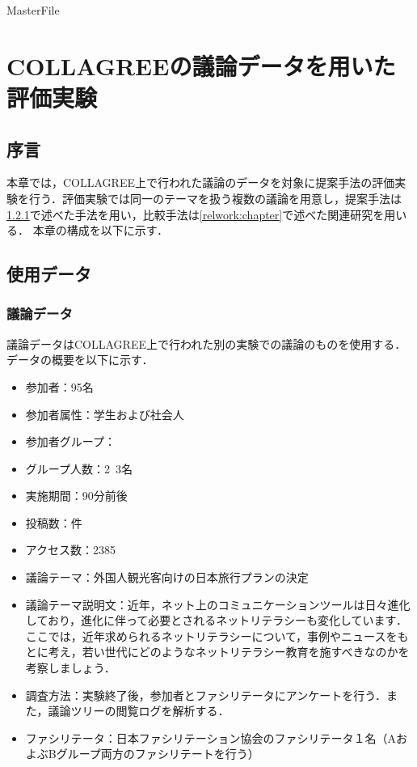 \expandafter\ifx\csname MasterFile\endcsname\relax
\def\SubFile{hoge}


\setcounter{chapter}{4}
\fi
\cleardoublepage
\chapter{COLLAGREEの議論データを用いた評価実験}

\label{exp:chapter}

\section{序言}
\label{exp:introduction}
本章では，COLLAGREE上で行われた議論のデータを対象に提案手法の評価実験を行う．評価実験では同一のテーマを扱う複数の議論を用意し，提案手法は\ref{}で述べた手法を用い，比較手法は\ref{relwork:chapter}で述べた関連研究を用いる．
本章の構成を以下に示す．
%
\clearpage
\section{使用データ}
\subsection{議論データ}
議論データはCOLLAGREE上で行われた別の実験での議論のものを使用する．データの概要を以下に示す．
\\
\begin{itemize}
\item 参加者：95名
\item 参加者属性：学生および社会人
\item 参加者グループ：
\item グループ人数：2~3名
\item 実施期間：90分前後
\item 投稿数：件
\item アクセス数：2385
\item 議論テーマ：外国人観光客向けの日本旅行プランの決定
\item 議論テーマ説明文：近年，ネット上のコミュニケーションツールは日々進化しており，進化に伴って必要とされるネットリテラシーも変化しています． ここでは，近年求められるネットリテラシーについて，事例やニュースをもとに考え，若い世代にどのようなネットリテラシー教育を施すべきなのかを考察しましょう．
\item 調査方法：実験終了後，参加者とファシリテータにアンケートを行う．また，議論ツリーの閲覧ログを解析する．
\item ファシリテータ：日本ファシリテーション協会のファシリテータ１名（AおよぶBグループ両方のファシリテートを行う）
\end{itemize}

